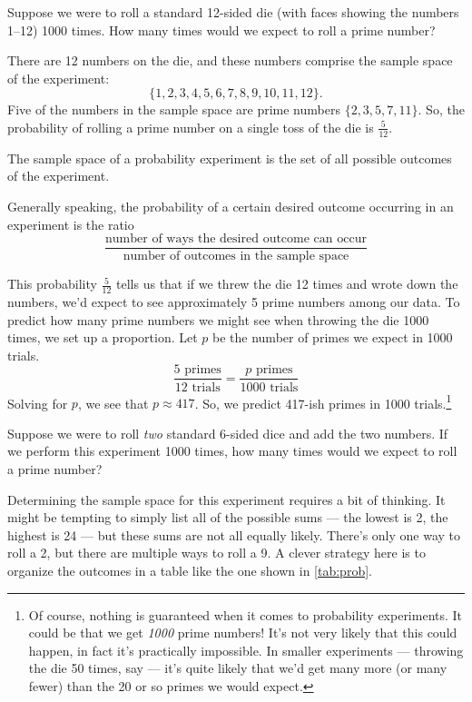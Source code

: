 \begin{boxexplore}[1d12]
Suppose we were to roll a standard 12-sided die (with faces showing the numbers 1--12) 1000 times. How many times would we expect to roll a prime number?
\end{boxexplore}

There are 12 numbers on the die, and these numbers comprise the \gls{sample space} of the experiment: \[\{1, 2, 3, 4, 5, 6, 7, 8, 9, 10, 11, 12\}.\] Five of the numbers in the sample space are prime numbers $\{2, 3, 5, 7, 11\}$. So, the probability of rolling a prime number on a single toss of the die is $\frac{5}{12}$.

\begin{boxdef}
The sample space of a probability experiment is the set of all possible outcomes of the experiment.
\end{boxdef}

Generally speaking, the probability of a certain desired outcome occurring in an experiment is the ratio \[\frac{\text{number of ways the desired outcome can occur}}{\text{number of outcomes in the sample space}}\]

This probability $\frac{5}{12}$ tells us that if we threw the die 12 times and wrote down the numbers, we'd expect to see approximately 5 prime numbers among our data. To predict how many prime numbers we might see when throwing the die 1000 times, we set up a proportion. Let $p$ be the number of primes we expect in 1000 trials. \[\frac{5\text{ primes}}{12\text{ trials}} = \frac{p\text{ primes}}{1000\text{ trials}}\] Solving for $p$, we see that $p\approx417$. So, we predict 417-ish primes in 1000 trials.\footnote{Of course, nothing is guaranteed when it comes to probability experiments. It could be that we get \textit{1000} prime numbers! It's not very likely that this could happen, in fact it's practically impossible. In smaller experiments --- throwing the die 50 times, say --- it's quite likely that we'd get many more (or many fewer) than the 20 or so primes we would expect.}

\begin{boxexplore}[2d6]
Suppose we were to roll \textit{two} standard 6-sided dice and add the two numbers. If we perform this experiment 1000 times, how many times would we expect to roll a prime number?
\end{boxexplore}

Determining the sample space for this experiment requires a bit of thinking. It might be tempting to simply list all of the possible sums --- the lowest is 2, the highest is 24 --- but these sums are not all equally likely. There's only one way to roll a 2, but there are multiple ways to roll a 9. A clever strategy here is to organize the outcomes in a table like the one shown in \cref{tab:prob}.

